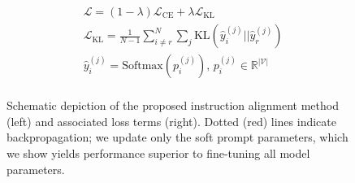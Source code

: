 







\begin{figure}[h]
  \centering
  \begin{subfigure}[b]{0.6\textwidth}
    \centering
  \end{subfigure}
  \hfill
  \begin{subfigure}[b]{0.125\textwidth}
    \begin{align*}
       & \mathcal{L} = (1-\lambda)\mathcal{L}_{\text{CE}} + \lambda\mathcal{L}_{\text{KL}}                              \\
       & \mathcal{L}_{\text{KL}} = \frac{1}{N-1}\sum_{i\neq r}^{N}\sum_j \text{KL}(\hat{y}_{i}^{(j)} ||\hat{y}_r^{(j)}) \\
       & \hat{y}_{i}^{(j)} = \text{Softmax}(p_{i}^{(j)})\text{, }p_{i}^{(j)}\in\mathbb{R}^{|\mathcal{V}|}               \\
    \end{align*}
  \end{subfigure}
  \caption{Schematic depiction of the proposed instruction alignment method (left) and associated loss terms (right). Dotted (red) lines indicate backpropagation; we update only the soft prompt parameters, which we show yields performance superior to fine-tuning all model parameters.
    \label{fig:method-schematic}}
\end{figure}

